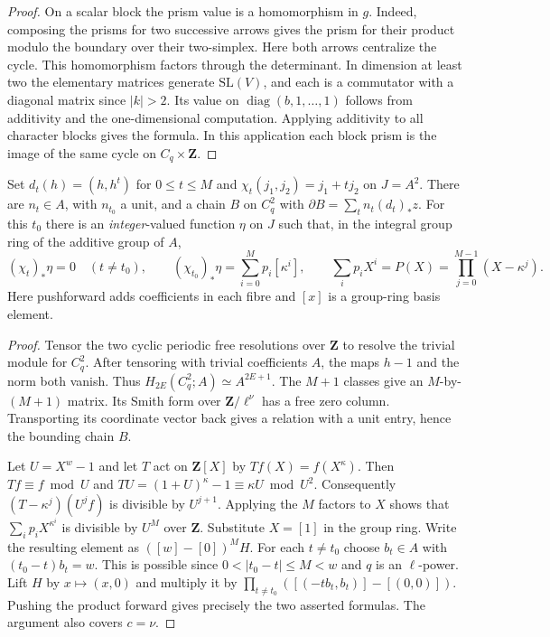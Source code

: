 \begin{proof}
On a scalar block the prism value is a homomorphism in \(g\).
Indeed, composing the prisms for two successive arrows gives the
prism for their product modulo the boundary over their two-simplex.
Here both arrows centralize the cycle. This homomorphism factors
through the determinant. In dimension at least two the elementary
matrices generate \(\mathrm{SL}(V)\), and each is a commutator
with a diagonal matrix since \(|k|>2\). Its value on
\(\operatorname{diag}(b,1,\dots,1)\) follows from additivity and the
one-dimensional computation. Applying additivity to all character
blocks gives the formula. In this application each block prism is
the image of the same cycle on \(C_q\times\mathbf Z\).
\end{proof}

\begin{lemma}\label{addc:filter}
Set \(d_t(h)=(h,h^t)\) for \(0\le t\le M\) and
\(\chi_t(j_1,j_2)=j_1+t j_2\) on \(J=A^2\).
There are \(n_t\in A\), with \(n_{t_0}\) a unit, and a chain \(B\)
on \(C_q^2\) with \(\partial B=\sum_t n_t(d_t)_*z\).
For this \(t_0\) there is an \emph{integer}-valued function \(\eta\)
on \(J\) such that, in the integral group ring of the additive group
of \(A\),
\[
 (\chi_t)_*\eta=0\quad(t\ne t_0),\qquad
 (\chi_{t_0})_*\eta=\sum_{i=0}^M p_i[\kappa^i],\qquad
 \sum_i p_i X^i=P(X)=\prod_{j=0}^{M-1}(X-\kappa^j).
\]
Here pushforward adds coefficients in each fibre and \([x]\) is a
group-ring basis element.
\end{lemma}
\begin{proof}
Tensor the two cyclic periodic free resolutions over \(\mathbf Z\)
to resolve the trivial module for \(C_q^2\). After tensoring with
trivial coefficients \(A\), the maps \(h-1\) and the norm both
vanish. Thus \(H_{2E}(C_q^2;A)\simeq A^{2E+1}\). The \(M+1\)
classes give an \(M\)-by-\((M+1)\) matrix. Its Smith form over
\(\mathbf Z/\ell^\nu\) has a free zero column. Transporting its
coordinate vector back gives a relation with a unit entry, hence
the bounding chain \(B\).

Let \(U=X^w-1\) and let \(T\) act on \(\mathbf Z[X]\) by
\(Tf(X)=f(X^\kappa)\). Then \(Tf\equiv f\bmod U\) and
\(TU=(1+U)^\kappa-1\equiv\kappa U\bmod U^2\). Consequently
\((T-\kappa^j)(U^j f)\) is divisible by \(U^{j+1}\). Applying
the \(M\) factors to \(X\) shows that \(\sum_i p_i X^{\kappa^i}\)
is divisible by \(U^M\) over \(\mathbf Z\). Substitute \(X=[1]\)
in the group ring. Write the resulting element as
\(([w]-[0])^M H\). For each \(t\ne t_0\) choose \(b_t\in A\) with
\((t_0-t)b_t=w\). This is possible since \(0<|t_0-t|\le M<w\)
and \(q\) is an \(\ell\)-power. Lift \(H\) by \(x\mapsto(x,0)\)
and multiply it by
\(\prod_{t\ne t_0}([(-t b_t,b_t)]-[(0,0)])\).
Pushing the product forward gives precisely the two asserted
formulas. The argument also covers \(c=\nu\).
\end{proof}

